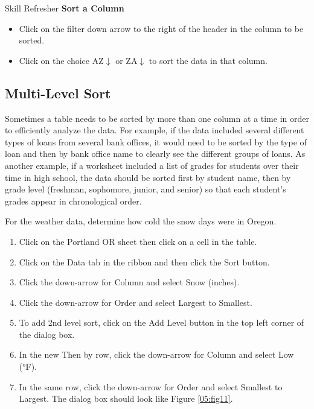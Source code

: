 \begin{center}
	\begin{sklbox}{Skill Refresher}
		\textbf{Sort a Column}
		\\
		\begin{itemize}
			\setlength{\itemsep}{0pt}
			\setlength{\parskip}{0pt}
			\setlength{\parsep}{0pt}

			\item Click on the filter down arrow to the right of the header in the column to be sorted.
			\item Click on the choice AZ$ \downarrow $ or ZA$ \downarrow $ to sort the data in that column.
						
		\end{itemize}
	\end{sklbox}
\end{center}

\subsection{Multi-Level Sort}

Sometimes a table needs to be sorted by more than one column at a time in order to efficiently analyze the data. For example, if the data included several different types of loans from several bank offices, it would need to be sorted by the type of loan and then by bank office name to clearly see the different groups of loans. As another example, if a worksheet included a list of grades for students over their time in high school, the data should be sorted first by student name, then by grade level (freshman, sophomore, junior, and senior) so that each student's grades appear in chronological order.

For the weather data, determine how cold the snow days were in Oregon.

\begin{enumerate}
	\item Click on the Portland OR sheet then click on a cell in the table.
	\item Click on the Data tab in the ribbon and then click the Sort button.
	\item Click the down-arrow for Column and select Snow (inches).
	\item Click the down-arrow for Order and select Largest to Smallest.
	\item To add 2nd level sort, click on the Add Level button in the top left corner of the dialog box.
	\item In the new Then by row, click the down-arrow for Column and select Low (°F).
	\item In the same row, click the down-arrow for Order and select Smallest to Largest. The dialog box should look like Figure \ref{05:fig11}.
\end{enumerate}

